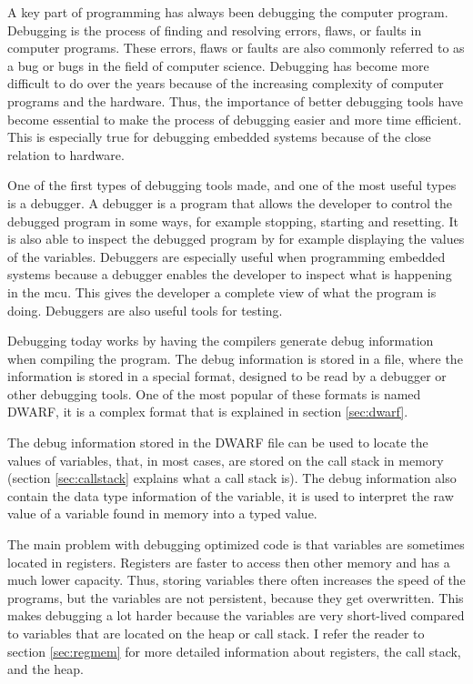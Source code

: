 
A key part of programming has always been debugging the computer program.
Debugging is the process of finding and resolving errors, flaws, or faults in computer programs.
These errors, flaws or faults are also commonly referred to as a bug or bugs in the field of computer science.
Debugging has become more difficult to do over the years because of the increasing complexity of computer programs and the hardware.
Thus, the importance of better debugging tools have become essential to make the process of debugging easier and more time efficient.
This is especially true for debugging  embedded systems because of the close relation to hardware.


One of the first types of debugging tools made, and one of the most useful types is a debugger.
A debugger is a program that allows the developer to control the debugged program in some ways, for example stopping, starting and resetting.
It is also able to inspect the debugged program by for example displaying the values of the variables.
Debuggers are especially useful when programming embedded systems because a debugger enables the developer to inspect what is happening in the \gls{mcu}.
This gives the developer a complete view of what the program is doing.
Debuggers are also useful tools for testing.


Debugging today works by having the compilers generate debug information when compiling the program.
The debug information is stored in a file, where the information is stored in a special format, designed to be read by a debugger or other debugging tools.
One of the most popular of these formats is named \gls{DWARF}, it is a complex format that is explained in section \ref{sec:dwarf}.


The debug information stored in the \gls{DWARF} file can be used to locate the values of variables, that, in most cases, are stored on the call stack in memory (section \ref{sec:callstack} explains what a call stack is).
The debug information also contain the data type information of the variable, it is used to interpret the raw value of a variable found in memory into a typed value.


The main problem with debugging optimized code is that variables are sometimes located in registers.
Registers are faster to access then other memory and has a much lower capacity.
Thus, storing variables there often increases the speed of the programs, but the variables are not persistent, because they get overwritten.
This makes debugging a lot harder because the variables are very short-lived compared to variables that are located on the heap or call stack.
I refer the reader to section \ref{sec:regmem} for more detailed information about registers, the call stack, and the heap.


